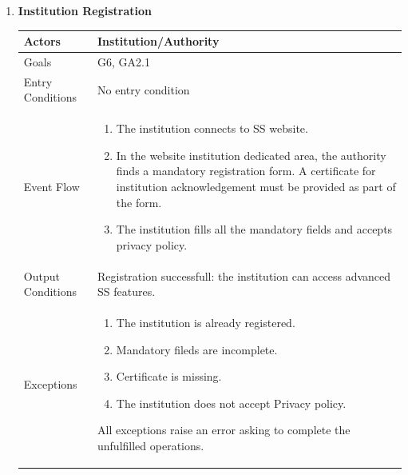 \begin{enumerate}
	\clearpage
	
	\item \textbf{Institution Registration}
		\begin{table}[h!]
		\centering
		\begin{tabular}{|l|p{}|}
		\hline
		Actors            			&       	Institution/Authority\\ \hline
		Goals             			&         	G6, GA2.1\\ \hline
		Entry Conditions  	&  		No entry condition\\ \hline
		Event Flow        		&          
				\begin{enumerate}[label=\alph*)]
					\item The institution connects to SS website.
					\item In the website institution dedicated area, the authority finds a mandatory registration form. A certificate for institution acknowledgement must be provided as part of the form.
					\item The institution fills all the mandatory fields and accepts privacy policy.
					\end{enumerate}\\ \hline
		Output Conditions &    		Registration successfull: the institution can access advanced SS features.\\ \hline
		Exceptions        		&
				\begin{enumerate}[label=\alph*)]
					\item The institution is already registered.
					\item Mandatory fileds are incomplete.
					\item Certificate is missing.
					\item The institution does not accept Privacy policy.
				\end{enumerate}
				All exceptions raise an error asking to complete the unfulfilled operations. \\ \hline
	\end{tabular}
	\end{table}
	

\end{enumerate}
